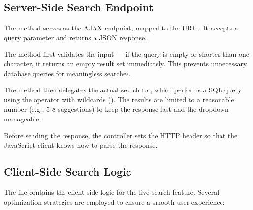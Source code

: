 \documentclass[12pt,a4paper]{report}
\begin{document}
\subsection{Server-Side Search Endpoint}

The  method serves as the AJAX endpoint, mapped to the URL . It accepts a  query parameter and returns a JSON response.

The method first validates the input — if the query is empty or shorter than one character, it returns an empty result set immediately. This prevents unnecessary database queries for meaningless searches.

The method then delegates the actual search to , which performs a SQL query using the  operator with wildcards (). The results are limited to a reasonable number (e.g., 5-8 suggestions) to keep the response fast and the dropdown manageable.

Before sending the response, the controller sets the  HTTP header so that the JavaScript client knows how to parse the response.

\subsection{Client-Side Search Logic}

The  file contains the client-side logic for the live search feature. Several optimization strategies are employed to ensure a smooth user experience:
\end{document}
